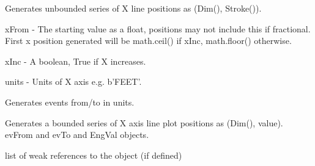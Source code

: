 \documentclass[letterpaper,10pt,english]{sphinxmanual}
\begin{document}
\begin{fulllineitems}
\begin{fulllineitems}
\end{fulllineitems}


\begin{fulllineitems}
\label{\detokenize{ref/util/plot/XGrid:TotalDepth.util.plot.XGrid.XGrid.genXPosStroke}}
Generates unbounded series of X line positions as (Dim(), Stroke()).

xFrom - The starting value as a float, positions may not include this
if fractional. First x position generated will be math.ceil()
if xInc, math.floor() otherwise.

xInc - A boolean, True if X increases.

units - Units of X axis e.g. b’FEET’.

\end{fulllineitems}


\begin{fulllineitems}
\label{\detokenize{ref/util/plot/XGrid:TotalDepth.util.plot.XGrid.XGrid.genEventsUnits}}
Generates events from/to in units.

\end{fulllineitems}


\begin{fulllineitems}
\label{\detokenize{ref/util/plot/XGrid:TotalDepth.util.plot.XGrid.XGrid.genXAxisTextRange}}
Generates a bounded series of X axis line plot positions as
(Dim(), value). evFrom and evTo and EngVal objects.

\end{fulllineitems}


\begin{fulllineitems}
\label{\detokenize{ref/util/plot/XGrid:TotalDepth.util.plot.XGrid.XGrid.__weakref__}}
list of weak references to the object (if defined)

\end{fulllineitems}


\end{fulllineitems}
\end{document}
